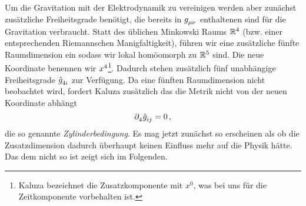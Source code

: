 Um die Gravitation mit der Elektrodynamik zu vereinigen werden aber zunächst 
zusätzliche Freiheitsgrade benötigt, die bereits in $\tensor{g}{_\mu_\nu}$
enthaltenen sind für die Gravitation verbraucht.
Statt des üblichen Minkowski Raums $\mathbb{R}^4$ (bzw. einer entsprechenden
Riemannschen Manigfaltigkeit), führen wir eine zusätzliche fünfte Raumdimension
ein sodass wir lokal homöomorph zu $\mathbb{R}^5$ sind. 
Die neue Koordinate benennen wir $\tensor{x}{^4}$\footnote{Kaluza
bezeichnet die Zusatzkomponente mit $x^0$, was bei uns für die Zeitkomponente
vorbehalten ist.}.
Dadurch stehen zusätzlich fünf
unabhängige Freiheitsgrade $\tensor{\hat{g}}{_4_i}$ zur Verfügung. Da eine
fünften Raumdimension nicht beobachtet wird, fordert Kaluza zusätzlich das die
Metrik nicht von der neuen Koordinate abhängt
\begin{equation}
\tensor{\partial}{_4} \tensor{\hat{g}}{_i_j}=0\,,\label{eq:Zylinderbed}
\end{equation}
die so genannte \emph{Zylinderbedingung}.
Es mag jetzt zunächst so erscheinen als ob die Zusatzdimension dadurch überhaupt
keinen Einfluss mehr auf die Physik hätte. Das dem nicht so ist zeigt sich im
Folgenden.

